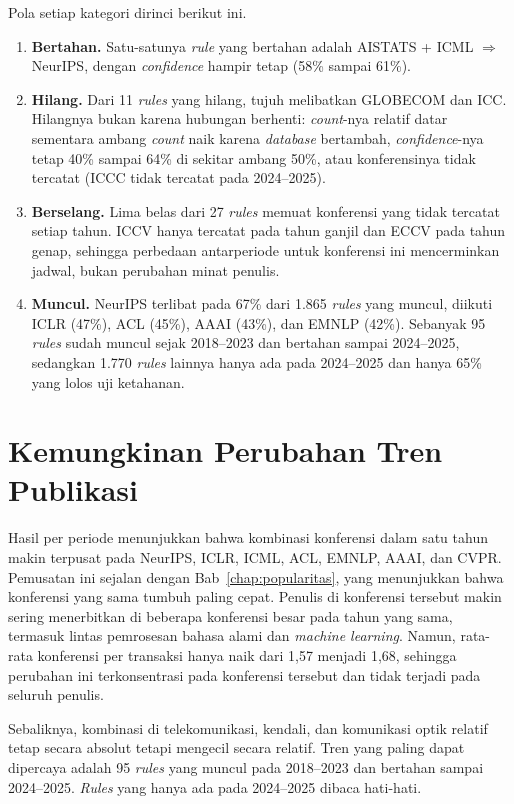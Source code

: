 Pola setiap kategori dirinci berikut ini.
\begin{enumerate}
\item \textbf{Bertahan.} Satu-satunya \textit{rule} yang bertahan adalah AISTATS + ICML $\Rightarrow$ NeurIPS, dengan \textit{confidence} hampir tetap (58\% sampai 61\%).
\item \textbf{Hilang.} Dari 11 \textit{rules} yang hilang, tujuh melibatkan GLOBECOM dan ICC. Hilangnya bukan karena hubungan berhenti: \textit{count}-nya relatif datar sementara ambang \textit{count} naik karena \textit{database} bertambah, \textit{confidence}-nya tetap 40\% sampai 64\% di sekitar ambang 50\%, atau konferensinya tidak tercatat (ICCC tidak tercatat pada 2024--2025).
\item \textbf{Berselang.} Lima belas dari 27 \textit{rules} memuat konferensi yang tidak tercatat setiap tahun. ICCV hanya tercatat pada tahun ganjil dan ECCV pada tahun genap, sehingga perbedaan antarperiode untuk konferensi ini mencerminkan jadwal, bukan perubahan minat penulis.
\item \textbf{Muncul.} NeurIPS terlibat pada 67\% dari 1.865 \textit{rules} yang muncul, diikuti ICLR (47\%), ACL (45\%), AAAI (43\%), dan EMNLP (42\%). Sebanyak 95 \textit{rules} sudah muncul sejak 2018--2023 dan bertahan sampai 2024--2025, sedangkan 1.770 \textit{rules} lainnya hanya ada pada 2024--2025 dan hanya 65\% yang lolos uji ketahanan.
\end{enumerate}

\section{Kemungkinan Perubahan Tren Publikasi}
\label{sec:hasil-e-tren}
Hasil per periode menunjukkan bahwa kombinasi konferensi dalam satu tahun makin terpusat pada NeurIPS, ICLR, ICML, ACL, EMNLP, AAAI, dan CVPR. Pemusatan ini sejalan dengan Bab~\ref{chap:popularitas}, yang menunjukkan bahwa konferensi yang sama tumbuh paling cepat. Penulis di konferensi tersebut makin sering menerbitkan di beberapa konferensi besar pada tahun yang sama, termasuk lintas pemrosesan bahasa alami dan \textit{machine learning}. Namun, rata-rata konferensi per transaksi hanya naik dari 1,57 menjadi 1,68, sehingga perubahan ini terkonsentrasi pada konferensi tersebut dan tidak terjadi pada seluruh penulis.

Sebaliknya, kombinasi di telekomunikasi, kendali, dan komunikasi optik relatif tetap secara absolut tetapi mengecil secara relatif. Tren yang paling dapat dipercaya adalah 95 \textit{rules} yang muncul pada 2018--2023 dan bertahan sampai 2024--2025. \textit{Rules} yang hanya ada pada 2024--2025 dibaca hati-hati.
